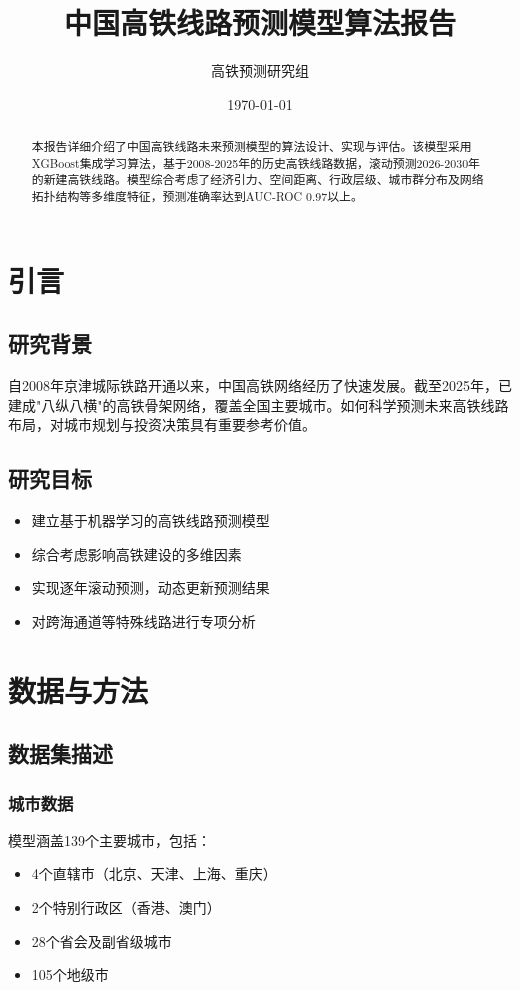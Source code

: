 \documentclass[12pt,a4paper]{article}
\title{中国高铁线路预测模型算法报告}
\author{高铁预测研究组}
\date{\today}
\begin{document}
\maketitle

\begin{abstract}
本报告详细介绍了中国高铁线路未来预测模型的算法设计、实现与评估。该模型采用XGBoost集成学习算法，基于2008-2025年的历史高铁线路数据，滚动预测2026-2030年的新建高铁线路。模型综合考虑了经济引力、空间距离、行政层级、城市群分布及网络拓扑结构等多维度特征，预测准确率达到AUC-ROC 0.97以上。
\end{abstract}

\section{引言}

\subsection{研究背景}
自2008年京津城际铁路开通以来，中国高铁网络经历了快速发展。截至2025年，已建成"八纵八横"的高铁骨架网络，覆盖全国主要城市。如何科学预测未来高铁线路布局，对城市规划与投资决策具有重要参考价值。

\subsection{研究目标}
\begin{itemize}
    \item 建立基于机器学习的高铁线路预测模型
    \item 综合考虑影响高铁建设的多维因素
    \item 实现逐年滚动预测，动态更新预测结果
    \item 对跨海通道等特殊线路进行专项分析
\end{itemize}

\section{数据与方法}

\subsection{数据集描述}

\subsubsection{城市数据}
模型涵盖139个主要城市，包括：
\begin{itemize}
    \item 4个直辖市（北京、天津、上海、重庆）
    \item 2个特别行政区（香港、澳门）
    \item 28个省会及副省级城市
    \item 105个地级市
\end{itemize}
\end{document}
